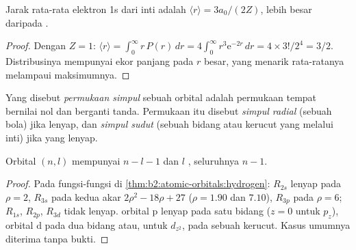 \begin{proposition}\label{prop:b2:atomic-orbitals:mean-radius}
Jarak rata-rata elektron 1s dari inti adalah $\langle r\rangle = 3a_0/(2Z)$,
lebih besar daripada .
\end{proposition}

\begin{proof}
Dengan $Z = 1$: $\langle r\rangle = \int_0^\infty r\,P(r)\,dr = 4\int_0^\infty r^3\mathrm e^{-2r}
\,dr = 4 \times 3!/2^4 = 3/2$. Distribusinya mempunyai ekor panjang pada $r$
besar, yang menarik rata-ratanya melampaui maksimumnya.
\end{proof}

\begin{definition}[Simpul]\label{def:b2:atomic-orbitals:node}
Yang disebut \emph{permukaan simpul} sebuah orbital
adalah permukaan tempat  bernilai nol dan berganti tanda.
Permukaan itu disebut \emph{simpul radial} (sebuah
bola) jika  lenyap, dan \emph{simpul sudut}
(sebuah bidang atau kerucut yang melalui inti) jika  yang
lenyap.
\end{definition}

\begin{proposition}\label{prop:b2:atomic-orbitals:nodes}
Orbital $(n, l)$ mempunyai $n - l - 1$  dan $l$ ,
seluruhnya $n - 1$.
\end{proposition}

\begin{proof}
Pada fungsi-fungsi di \cref{thm:b2:atomic-orbitals:hydrogen}: $R_{2s}$ lenyap
pada $\rho = 2$, $R_{3s}$ pada kedua akar $2\rho^2 - 18\rho + 27$ ($\rho = 1.90$
dan $7.10$), $R_{3p}$ pada $\rho = 6$; $R_{1s}$, $R_{2p}$, $R_{3d}$ tidak lenyap.
 orbital p lenyap pada satu bidang ($z = 0$ untuk $p_z$),
 orbital d pada dua bidang atau, untuk $d_{z^2}$, pada sebuah
kerucut. Kasus umumnya diterima tanpa bukti.
\end{proof}

